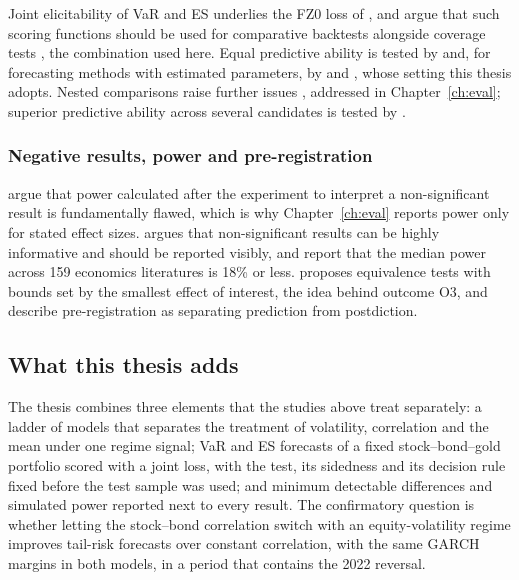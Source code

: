 Joint elicitability of VaR and ES \citep{fissler2016} underlies the FZ0 loss of \citet{patton2019}, and \citet{nolde2017} argue that such scoring functions should be used for comparative backtests alongside coverage tests \citep{kupiec1995,christoffersen1998}, the combination used here. Equal predictive ability is tested by \citet{diebold1995} and, for forecasting methods with estimated parameters, by \citet{west1996} and \citet{giacomini2006}, whose setting this thesis adopts. Nested comparisons raise further issues \citep{clark2001,clark2007,mccracken2020}, addressed in Chapter~\ref{ch:eval}; superior predictive ability across several candidates is tested by \citet{hansen2005}.

\subsubsection{Negative results, power and pre-registration}\label{sec:lit-null}

\citet{hoenig2001} argue that power calculated after the experiment to interpret a non-significant result is fundamentally flawed, which is why Chapter~\ref{ch:eval} reports power only for stated effect sizes. \citet{abadie2020} argues that non-significant results can be highly informative and should be reported visibly, and \citet{ioannidis2017} report that the median power across 159 economics literatures is 18\% or less. \citet{lakens2017} proposes equivalence tests with bounds set by the smallest effect of interest, the idea behind outcome O3, and \citet{nosek2018} describe pre-registration as separating prediction from postdiction.

\subsection{What this thesis adds}\label{sec:lit-adds}

The thesis combines three elements that the studies above treat separately: a ladder of models that separates the treatment of volatility, correlation and the mean under one regime signal; VaR and ES forecasts of a fixed stock--bond--gold portfolio scored with a joint loss, with the test, its sidedness and its decision rule fixed before the test sample was used; and minimum detectable differences and simulated power reported next to every result. The confirmatory question is whether letting the stock--bond correlation switch with an equity-volatility regime improves tail-risk forecasts over constant correlation, with the same GARCH margins in both models, in a period that contains the 2022 reversal.
